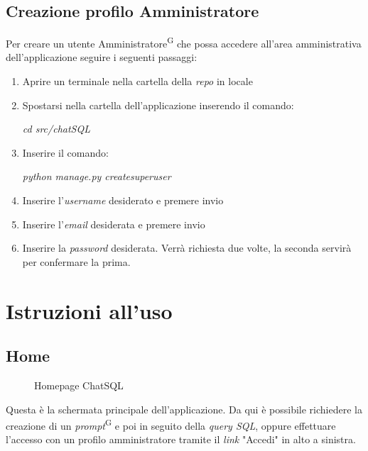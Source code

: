 \documentclass[5pt]{article}
\begin{document}
	    \subsection{Creazione profilo Amministratore}
	    Per creare un utente Amministratore\textsuperscript{G} che possa accedere all'area amministrativa dell'applicazione seguire i seguenti passaggi:
	    \begin{enumerate}
	    	\item Aprire un terminale nella cartella della \textit{repo} in locale
	    	\item Spostarsi nella cartella dell'applicazione inserendo il comando:
	    	\begin{center}
	    		\textit{cd src/chatSQL}
	    	\end{center}
	    	\item Inserire il comando:
	    	\begin{center}
	    		\textit{python manage.py createsuperuser}
	    	\end{center}
	    	\item Inserire l'\textit{username} desiderato e premere invio
	    	\item Inserire l'\textit{email} desiderata e premere invio
	    	\item Inserire la \textit{password} desiderata. Verrà richiesta due volte, la seconda servirà per confermare la prima.
	    \end{enumerate}
    
    \section{Istruzioni all'uso}
	    \subsection{Home}
	    \begin{figure}[ht]
	    	\centering
	    	\caption{Homepage ChatSQL}
	    \end{figure}
	    Questa è la schermata principale dell'applicazione. Da qui è possibile richiedere la creazione di un \textit{prompt}\textsuperscript{G} e poi in seguito della \textit{query SQL}, oppure effettuare l'accesso con un profilo amministratore tramite il \textit{link} "Accedi" in alto a sinistra.
	    
\end{document}
